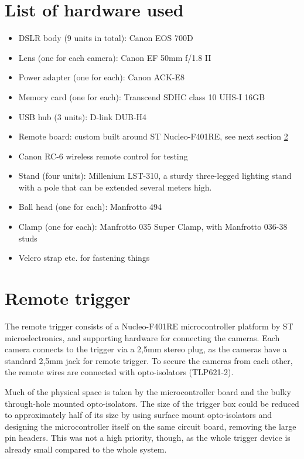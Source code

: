 \section{List of hardware used} \label{app:hardwareused}

\begin{itemize}
	\item DSLR body (9 units in total): Canon EOS 700D
	\item Lens (one for each camera): Canon EF 50mm f/1.8 II
	\item Power adapter (one for each): Canon ACK-E8
	\item Memory card (one for each): Transcend SDHC class 10 UHS-I 16GB
	\item USB hub (3 units): D-link DUB-H4
	\item Remote board: custom built around ST Nucleo-F401RE, see next section \ref{app:remotetrigger}
	\item Canon RC-6 wireless remote control for testing
	\item Stand (four units): Millenium LST-310, a sturdy three-legged lighting stand with a pole that can be extended several meters high.
	\item Ball head (one for each): Manfrotto 494
	\item Clamp (one for each): Manfrotto 035 Super Clamp, with Manfrotto 036-38 studs
	\item Velcro strap etc. for fastening things
\end{itemize}

\clearpage

\section{Remote trigger} \label{app:remotetrigger}

The remote trigger consists of a Nucleo-F401RE microcontroller platform by ST microelectronics, and supporting hardware for connecting the cameras.
Each camera connects to the trigger via a 2,5mm stereo plug, as the cameras have a standard 2,5mm jack for remote trigger.
To secure the cameras from each other, the remote wires are connected with opto-isolators (TLP621-2).

Much of the physical space is taken by the microcontroller board and the bulky through-hole mounted opto-isolators.
The size of the trigger box could be reduced to approximately half of its size by using surface mount opto-isolators and designing the microcontroller itself on the same circuit board, removing the large pin headers.
This was not a high priority, though, as the whole trigger device is already small compared to the whole system.

